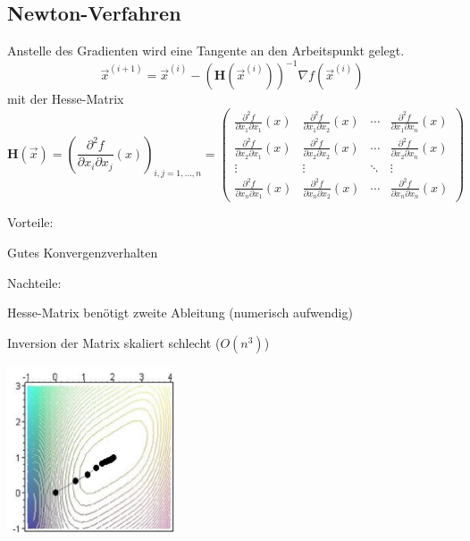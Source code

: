 \subsection{Newton-Verfahren}
  \begin{minipage}{14cm}
    Anstelle des Gradienten wird eine Tangente an den Arbeitspunkt gelegt.
    $$\vec{x}^{(i+1)} = \vec{x}^{(i)} - (\bm H(\vec{x}^{(i)}))^{-1} \nabla f(\vec{x}^{(i)})$$
    mit der Hesse-Matrix
    $$\bm{H}(\vec{x})=
    \left(\frac{\partial^2f}{\partial x_i\partial x_j}(x)\right)_{i,j=1,\dots, n}=
    \begin{pmatrix}
    \frac{\partial^2 f}{\partial x_1\partial x_1}(x)&\frac{\partial^2 f}{\partial x_1\partial x_2}(x)&\cdots&\frac{\partial^2  f}{\partial x_1\partial x_n}(x)\\[0.5em]
    \frac{\partial^2 f}{\partial x_2\partial x_1}(x)&\frac{\partial^2 f}{\partial x_2\partial x_2}(x)&\cdots&\frac{\partial^2  f}{\partial x_2\partial x_n}(x)\\
    \vdots&\vdots&\ddots&\vdots\\
    \frac{\partial^2 f}{\partial x_n\partial x_1}(x)&\frac{\partial^2 f}{\partial x_n\partial x_2}(x)&\cdots&\frac{\partial^2  f}{\partial x_n\partial x_n}(x)
    \end{pmatrix}$$
    
    Vorteile:
    \begin{liste}
      \item Gutes Konvergenzverhalten
    \end{liste}
    
    Nachteile:
    \begin{liste}
      \item Hesse-Matrix benötigt zweite Ableitung (numerisch aufwendig)
      \item Inversion der Matrix skaliert schlecht ($O(n^3)$)
    \end{liste}
  \end{minipage}
  \begin{minipage}{5cm}
    \includegraphics[width=5cm]{./Content/NonLinearOptimization/newton}
  \end{minipage}
  
